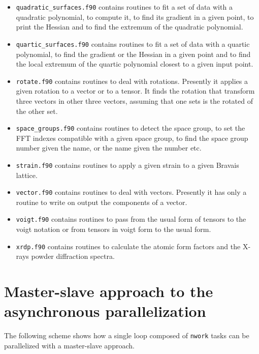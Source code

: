 \documentclass[12pt,a4paper]{article}
\begin{document}
\begin{itemize}
\item
\texttt{quadratic\_surfaces.f90} contains routines to fit a set of data
with a quadratic polynomial, to compute it, to find its gradient 
in a given point, to print the Hessian and to find the extremum of the 
quadratic polynomial. 

\item
\texttt{quartic\_surfaces.f90} contains routines to fit a set of data
with a quartic polynomial, to find the gradient or the Hessian in 
a given point and to find the local extremum of the quartic polynomial
closest to a given input point. 

\item
\texttt{rotate.f90} contains routines to deal with rotations. Presently it
applies a given rotation to a vector or to a tensor.
It finds the rotation that transform three vectors in other three vectors,
assuming that one sets is the rotated of the other set.

\item
\texttt{space\_groups.f90} contains routines to detect the space group,
to set the FFT indexes compatible with a given space group, to find the
space group number given the name, or the name given the number etc.

\item
\texttt{strain.f90} contains routines to apply a given strain to a given
Bravais lattice.

\item
\texttt{vector.f90} contains routines to deal with vectors.
Presently it has only a routine to write on output the components of
a vector.

\item
\texttt{voigt.f90} contains routines to pass from the usual form of tensors
to the voigt notation or from tensors in voigt form to the usual form.

\item
\texttt{xrdp.f90} contains routines to calculate the atomic form factors 
and the X-rays powder diffraction spectra.

\end{itemize}

\newpage
\section{\color{coral}Master-slave approach to the asynchronous parallelization}

The following scheme shows how a single loop composed of \texttt{nwork} tasks
can be parallelized with a master-slave approach.
\end{document}
